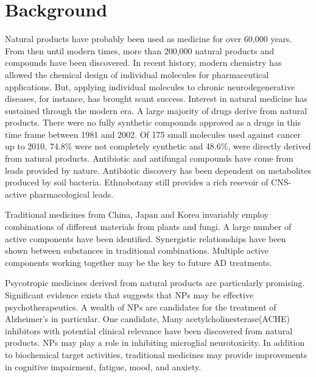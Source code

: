 \documentclass[twocolumn]{article}
\begin{document}
\section{Background}

Natural products have probably been used as medicine for over 60,000 years.
From then until modern times,
more than 200,000 natural products and compounds have been discovered.
\cite{ji2009natural}
In recent history, modern chemistry has allowed the chemical design of
individual molecules for pharmaceutical applications.
But, applying individual molecules to chronic neurodegenerative diseases, for instance,
has brought scant success.
Interest in natural medicine has sustained through the modern era.
A large majority of drugs derive from natural products.
There were no
fully synthetic compounds
approved as a drugs in this time frame
between 1981 and 2002.
\cite{newman2003natural}
Of 175 small molecules used against cancer up to 2010,
74.8\% were not completely synthetic and
48.6\%, were directly derived from natural products.
\cite{newman2012natural}
Antibiotic and antifungal compounds have come from leads provided by nature.
Antibiotic discovery has been dependent on metabolites produced by soil bacteria.
\cite{laursen2004phenazine}
Ethnobotany still provides a rich resevoir of CNS-active pharmacological leads.
\cite{mcclatchey2009ethnobotany, perry1999medicinal}

Traditional medicines from China, Japan and Korea invariably employ combinations
of different materials from plants and fungi.
A large number of active components have been identified.
\cite{gao2013research}
Synergistic relationships have been shown between substances
in traditional combinations.
Multiple active components working together may be the key
to future AD treatments.
\cite{kong2009hope, liu2014history}

Psycotropic medicines derived from natural products are particularly promising.
\cite{lake2000psychotropic}
Significant evidence exists that suggests that NPs
may be effective psychotherapeutics.
\cite{fugh1999dietary}
A wealth of NPs are candidates for the treatment of Alzheimer's in particular.
One candidate,
\cite{houghton2005natural}
Many acetylcholinesterase(ACHE) inhibitors with potential clinical relevance
have been discovered from natural products.
\cite{barbosa2006natural}
NPs may play a role in inhibiting microglial neurotoxicity.
\cite{choi2011inhibitors}
In addition to biochemical target activities,
traditional medicines may provide improvements in
cognitive impairment, fatigue, mood, and anxiety.
\cite{divino2011role}
\end{document}
